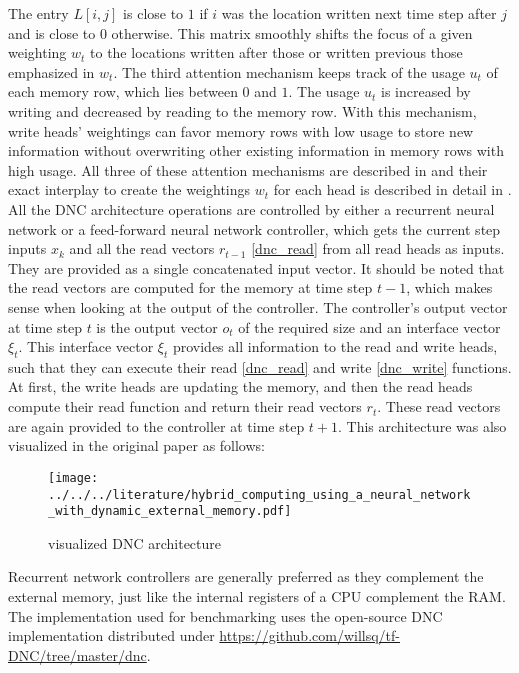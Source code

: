 \documentclass[draft,final]{vutinfth} %
\begin{document}
    The entry $L[i,j]$ is close to $1$ if $i$ was the location written next time step after $j$ and is close to $0$ otherwise.
    This matrix smoothly shifts the focus of a given weighting $w_t$ to the locations written after those or written previous those emphasized in $w_t$.
    The third attention mechanism keeps track of the usage $u_t$ of each memory row, which lies between $0$ and $1$. 
    The usage $u_t$ is increased by writing and decreased by reading to the memory row.
    With this mechanism, write heads' weightings can favor memory rows with low usage to store new information without overwriting other existing information in memory rows with high usage.
    All three of these attention mechanisms are described in \cite[p. 1-2]{DNC} and their exact interplay to create the weightings $w_t$ for each head is described in detail in \cite[p. 7-8]{DNC}.
    All the DNC architecture operations are controlled by either a recurrent neural network or a feed-forward neural network controller, which gets the current step inputs $x_k$ and all the read vectors $r_{t-1}$ \ref{dnc_read} from all read heads as inputs.
    They are provided as a single concatenated input vector.
    It should be noted that the read vectors are computed for the memory at time step $t-1$, which makes sense when looking at the output of the controller.
    The controller's output vector at time step $t$ is the output vector $o_t$ of the required size and an interface vector $\xi_t$.
    This interface vector $\xi_t$ provides all information to the read and write heads, such that they can execute their read \ref{dnc_read} and write \ref{dnc_write} functions.
    At first, the write heads are updating the memory, and then the read heads compute their read function and return their read vectors $r_t$.
    These read vectors are again provided to the controller at time step $t+1$.
    This architecture was also visualized in the original paper as follows:
    \begin{figure}[H]
        \centering{}
        \texttt{[image: ../../../literature/hybrid\_computing\_using\_a\_neural\_network\_with\_dynamic\_external\_memory.pdf]}
        \caption{visualized DNC architecture \cite[p. 2]{DNC}}
        \label{fig:dnc_vis}
    \end{figure}
    Recurrent network controllers are generally preferred as they complement the external memory, just like the internal registers of a CPU complement the RAM.
    The implementation used for benchmarking uses the open-source DNC implementation distributed under \url{https://github.com/willsq/tf-DNC/tree/master/dnc}.
\end{document}
